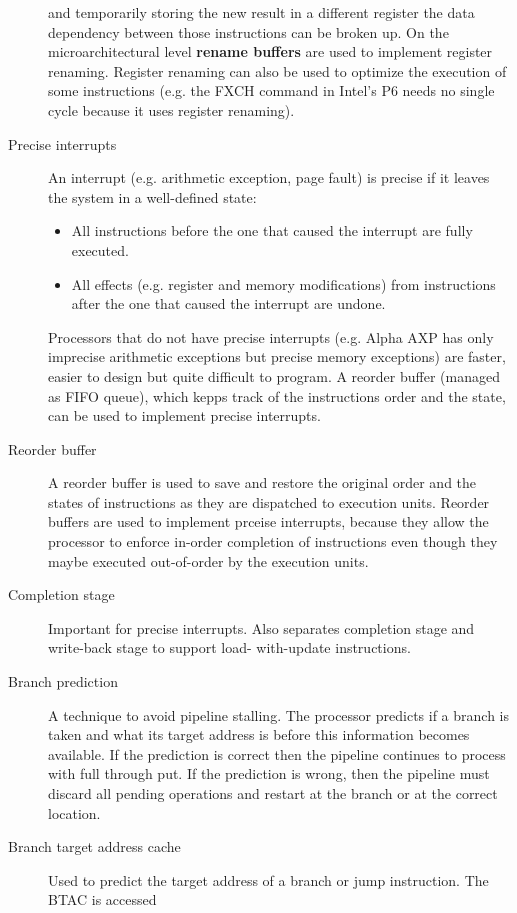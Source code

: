 \documentclass[a4paper,10pt]{article}
\begin{document}
\begin{description}
       and temporarily storing the new result in a different register the data dependency between those instructions can be broken up. On
       the microarchitectural level \textbf{rename buffers} are used to implement register renaming. Register renaming can also be used to optimize the execution of some instructions (e.g. the FXCH command in Intel's P6 needs no single cycle because it uses register renaming).
 \item[Precise interrupts] An interrupt (e.g. arithmetic exception, page fault) is precise if it leaves the system in a well-defined state:
 \begin{itemize}
   \item All instructions before the one that caused the interrupt are fully executed.
   \item All effects (e.g. register and memory modifications) from instructions after the one that caused the interrupt are undone.
 \end{itemize}
 Processors that do not have precise interrupts (e.g. Alpha AXP has only imprecise arithmetic exceptions but precise memory exceptions) are faster, easier to design but quite difficult to program. A reorder buffer (managed as FIFO queue), which kepps track of the instructions order
       and the state, can be used to implement precise interrupts\cite{powerpc}.
 \item[Reorder buffer] A reorder buffer is used to save and restore the original order and the states of instructions as they are dispatched
       to execution units. Reorder buffers are used to implement prceise interrupts, because they allow the processor to enforce in-order
       completion of instructions even though they maybe executed out-of-order by the execution units.
 \item[Completion stage] Important for precise interrupts. Also separates completion stage and write-back stage to support load-
       with-update instructions.
 \item[Branch prediction] A technique to avoid pipeline stalling. The processor predicts if a branch is taken and what its
       target address is before this information becomes available. If the prediction is correct then the pipeline continues to process
       with full through put. If the prediction is wrong, then the pipeline must discard all pending operations and restart at the branch or at the
       correct location.
 \item[Branch target address cache] Used to predict the target address of a branch or jump instruction. The BTAC is accessed

\end{description}
\end{document}
